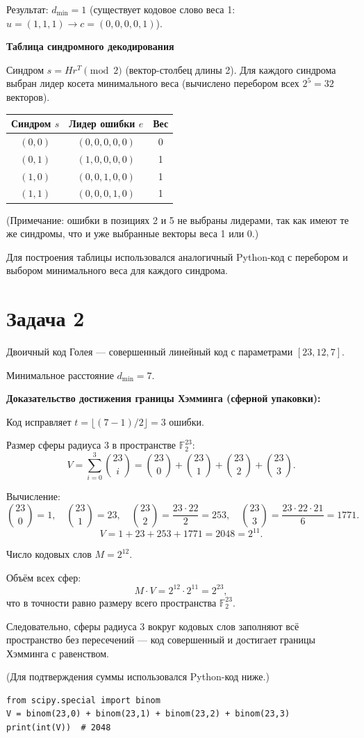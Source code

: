 \documentclass{article}
\begin{document}
Результат: $d_{\min}=1$ (существует кодовое слово веса 1: $u=(1,1,1) \to c=(0,0,0,0,1)$).

\textbf{Таблица синдромного декодирования}

Синдром $s = H r^T \pmod{2}$ (вектор-столбец длины 2).  
Для каждого синдрома выбран лидер косета минимального веса (вычислено перебором всех $2^5=32$ векторов).

\begin{center}
\begin{tabular}{|c|c|c|}
\hline
Синдром $s$ & Лидер ошибки $e$ & Вес \\
\hline
$(0,0)$ & $(0,0,0,0,0)$ & 0 \\
$(0,1)$ & $(1,0,0,0,0)$ & 1 \\
$(1,0)$ & $(0,0,1,0,0)$ & 1 \\
$(1,1)$ & $(0,0,0,1,0)$ & 1 \\
\hline
\end{tabular}
\end{center}

(Примечание: ошибки в позициях 2 и 5 не выбраны лидерами, так как имеют те же синдромы, что и уже выбранные векторы веса 1 или 0.)

Для построения таблицы использовался аналогичный Python-код с перебором и выбором минимального веса для каждого синдрома.

\section{Задача 2}

Двоичный код Голея — совершенный линейный код с параметрами $[23,12,7]$.

Минимальное расстояние $d_{\min}=7$.

\textbf{Доказательство достижения границы Хэмминга (сферной упаковки):}

Код исправляет $t = \lfloor (7-1)/2 \rfloor = 3$ ошибки.

Размер сферы радиуса 3 в пространстве $\mathbb{F}_2^{23}$:
\[
V = \sum_{i=0}^{3} \binom{23}{i} = \binom{23}{0} + \binom{23}{1} + \binom{23}{2} + \binom{23}{3}.
\]

Вычисление:
\[
\binom{23}{0}=1, \quad \binom{23}{1}=23, \quad \binom{23}{2}=\frac{23\cdot22}{2}=253, \quad \binom{23}{3}=\frac{23\cdot22\cdot21}{6}=1771.
\]
\[
V = 1 + 23 + 253 + 1771 = 2048 = 2^{11}.
\]

Число кодовых слов $M = 2^{12}$.

Объём всех сфер:
\[
M \cdot V = 2^{12} \cdot 2^{11} = 2^{23},
\]
что в точности равно размеру всего пространства $\mathbb{F}_2^{23}$.

Следовательно, сферы радиуса 3 вокруг кодовых слов заполняют всё пространство без пересечений — код совершенный и достигает границы Хэмминга с равенством.

(Для подтверждения суммы использовался Python-код ниже.)

\begin{verbatim}
from scipy.special import binom
V = binom(23,0) + binom(23,1) + binom(23,2) + binom(23,3)
print(int(V))  # 2048
\end{verbatim}
\end{document}
